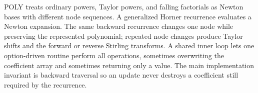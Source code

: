 \documentclass[10pt,letterpaper]{article}
\begin{document}
\begin{tcolorbox}[colback=Ink!4,colframe=Ink,title=Cornell summary]
POLY treats ordinary powers, Taylor powers, and falling factorials as Newton bases with different node sequences. A generalized Horner recurrence evaluates a Newton expansion. The same backward recurrence changes one node while preserving the represented polynomial; repeated node changes produce Taylor shifts and the forward or reverse Stirling transforms. A shared inner loop lets one option-driven routine perform all operations, sometimes overwriting the coefficient array and sometimes returning only a value. The main implementation invariant is backward traversal so an update never destroys a coefficient still required by the recurrence.
\end{tcolorbox}
\end{document}
